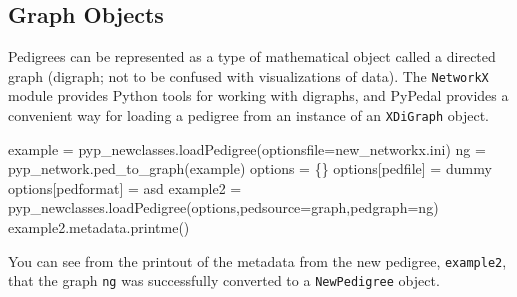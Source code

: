 \documentclass[
  letterpaper,
  DIV=11,
  numbers=noendperiod]{scrreprt}
\newenvironment{Shaded}{\begin{snugshade}}{\end{snugshade}}
\newcommand{\NormalTok}[1]{\textcolor[rgb]{0.00,0.23,0.31}{#1}}
\newcommand{\OperatorTok}[1]{\textcolor[rgb]{0.37,0.37,0.37}{#1}}
\newcommand{\StringTok}[1]{\textcolor[rgb]{0.13,0.47,0.30}{#1}}
\begin{document}
\subsection{Graph Objects}\label{graph-objects}

Pedigrees can be represented as a type of mathematical object called a
directed graph (digraph; not to be confused with visualizations of
data). The \texttt{NetworkX} module provides Python tools for working
with digraphs, and PyPedal provides a convenient way for loading a
pedigree from an instance of an \texttt{XDiGraph} object.

\begin{Shaded}
\begin{Highlighting}[]
\NormalTok{example }\OperatorTok{=}\NormalTok{ pyp\_newclasses.loadPedigree(optionsfile}\OperatorTok{=}\StringTok{\textquotesingle{}new\_networkx.ini\textquotesingle{}}\NormalTok{)}
\NormalTok{ng }\OperatorTok{=}\NormalTok{ pyp\_network.ped\_to\_graph(example)}
\NormalTok{options }\OperatorTok{=}\NormalTok{ \{\}}
\NormalTok{options[}\StringTok{\textquotesingle{}pedfile\textquotesingle{}}\NormalTok{] }\OperatorTok{=} \StringTok{\textquotesingle{}dummy\textquotesingle{}}
\NormalTok{options[}\StringTok{\textquotesingle{}pedformat\textquotesingle{}}\NormalTok{] }\OperatorTok{=} \StringTok{\textquotesingle{}asd\textquotesingle{}}
\NormalTok{example2 }\OperatorTok{=}\NormalTok{ pyp\_newclasses.loadPedigree(options,pedsource}\OperatorTok{=}\StringTok{\textquotesingle{}graph\textquotesingle{}}\NormalTok{,pedgraph}\OperatorTok{=}\NormalTok{ng)}
\NormalTok{example2.metadata.printme()}
\end{Highlighting}
\end{Shaded}

You can see from the printout of the metadata from the new pedigree,
\texttt{example2}, that the graph \texttt{ng} was successfully converted
to a \texttt{NewPedigree} object.
\end{document}
